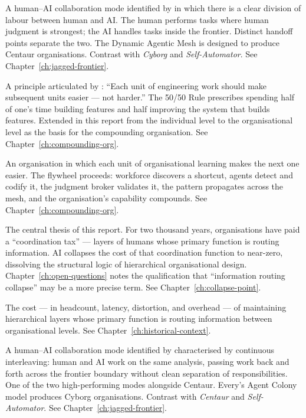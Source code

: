 \begin{description}[style=nextline, leftmargin=2em, font=\bfseries\color{navyblue}]
\item[Centaur]
A human--AI collaboration mode identified by \textcite{Randazzo2024} in which there is a clear division of labour between human and AI. The human performs tasks where human judgment is strongest; the AI handles tasks inside the frontier. Distinct handoff points separate the two. The Dynamic Agentic Mesh is designed to produce Centaur organisations. Contrast with \emph{Cyborg} and \emph{Self-Automator}. See Chapter~\ref{ch:jagged-frontier}.

\item[Compound Engineering]
A principle articulated by \textcite{Klaassen2025}: ``Each unit of engineering work should make subsequent units easier --- not harder.'' The 50/50 Rule prescribes spending half of one's time building features and half improving the system that builds features. Extended in this report from the individual level to the organisational level as the basis for the compounding organisation. See Chapter~\ref{ch:compounding-org}.

\item[Compounding Organisation]
An organisation in which each unit of organisational learning makes the next one easier. The flywheel proceeds: workforce discovers a shortcut, agents detect and codify it, the judgment broker validates it, the pattern propagates across the mesh, and the organisation's capability compounds. See Chapter~\ref{ch:compounding-org}.

\item[Coordination Collapse]
The central thesis of this report. For two thousand years, organisations have paid a ``coordination tax'' --- layers of humans whose primary function is routing information. AI collapses the cost of that coordination function to near-zero, dissolving the structural logic of hierarchical organisational design. Chapter~\ref{ch:open-questions} notes the qualification that ``information routing collapse'' may be a more precise term. See Chapter~\ref{ch:collapse-point}.

\item[Coordination Tax]
The cost --- in headcount, latency, distortion, and overhead --- of maintaining hierarchical layers whose primary function is routing information between organisational levels. See Chapter~\ref{ch:historical-context}.

\item[Cyborg]
A human--AI collaboration mode identified by \textcite{Randazzo2024} characterised by continuous interleaving: human and AI work on the same analysis, passing work back and forth across the frontier boundary without clean separation of responsibilities. One of the two high-performing modes alongside Centaur. Every's Agent Colony model produces Cyborg organisations. Contrast with \emph{Centaur} and \emph{Self-Automator}. See Chapter~\ref{ch:jagged-frontier}.


\end{description}
